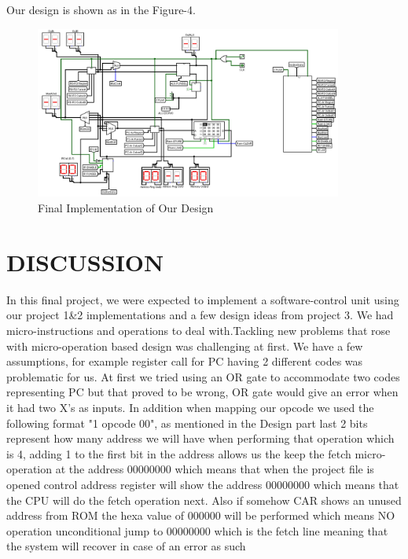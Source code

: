 \documentclass[pdftex,12pt,a4paper]{article}
\begin{document}
Our design is shown as in the Figure-4.

\begin{figure}[H]
    	\centering
    	\includegraphics[width=0.9\textwidth]{final.png}	
    	\caption{Final Implementation of Our Design}
    	\label{implement}
\end{figure}

\newpage

\section{DISCUSSION}

In this final project, we were expected to implement a software-control unit using our project 1\&2 implementations and a few design ideas from project 3. We had micro-instructions and operations to deal with.Tackling new problems that rose with micro-operation based design was challenging at first. We have a few assumptions, for example register call for PC having 2 different codes was problematic for us. At first we tried using an OR gate to accommodate two codes representing PC but that proved to be wrong, OR gate would give an error when it had two X's as inputs. In addition when mapping our opcode we used the following format "1 opcode 00", as mentioned in the Design part last 2 bits represent how many address we will have when performing that operation which is 4, adding 1 to the first bit in the address allows us the keep the fetch micro-operation at the address 00000000 which means that when the project file is opened control address  register will show the address 00000000 which means that the CPU will do the fetch operation next. Also if somehow CAR shows an unused address from ROM the hexa value of 000000 will be performed which means NO operation unconditional jump to 00000000 which is the fetch line meaning that the system will recover in case of an error as such
\end{document}
